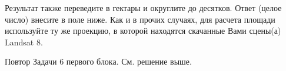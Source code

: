 Результат также переведите в гектары и округлите до десятков. Ответ (целое число) внесите в поле ниже.  Как и в прочих случаях, для расчета площади используйте ту же проекцию, в которой находятся скачанные Вами сцены(а) Landsat 8. 

\explanationSection

Повтор Задачи 6 первого блока. См. решение выше.

